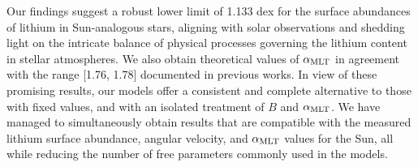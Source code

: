 Our findings suggest a robust lower limit of 1.133 dex for the surface abundances of lithium in Sun-analogous stars, aligning with solar observations and shedding light on the intricate balance of physical processes governing the lithium content in stellar atmospheres. We also obtain theoretical values of $\alpha_{\mathrm{MLT}}$ in agreement with the range [1.76, 1.78] documented in previous works. In view of these promising results, our models offer a consistent and complete alternative to those with fixed values, and with an isolated treatment of $B$ and $\alpha_{\mathrm{MLT}}$. We have managed to simultaneously obtain results that are compatible with the measured lithium surface abundance, angular velocity, and $\alpha_{\mathrm{MLT}}$ values for the Sun, all while reducing the number of free parameters commonly used in the models.

\endinput
